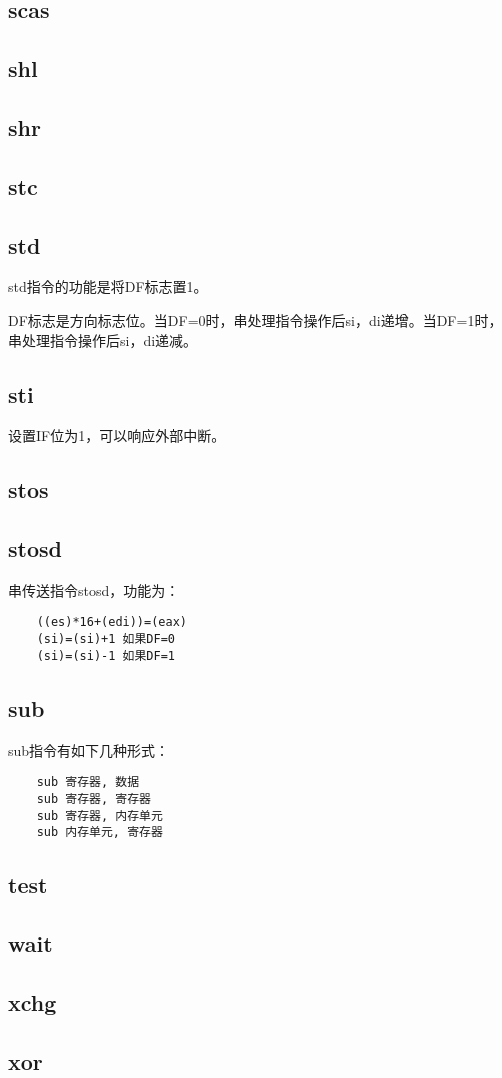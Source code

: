 \documentclass[a4paper,left=2.5cm,right=2.5cm,11pt]{article}
\begin{document}
\subsection{scas}
\subsection{shl}
\subsection{shr}
\subsection{stc}
\subsection{std}
	std指令的功能是将DF标志置1。\par
	DF标志是方向标志位。当DF=0时，串处理指令操作后si，di递增。当DF=1时，串处理指令操作后si，di递减。

\subsection{sti}
	设置IF位为1，可以响应外部中断。

\subsection{stos}
\subsection{stosd}
	串传送指令stosd，功能为：
	\begin{lstlisting}
	((es)*16+(edi))=(eax)
	(si)=(si)+1 如果DF=0
	(si)=(si)-1 如果DF=1
	\end{lstlisting}

\subsection{sub}
	sub指令有如下几种形式：
	\begin{lstlisting}
	sub 寄存器, 数据
	sub 寄存器, 寄存器
	sub 寄存器, 内存单元
	sub 内存单元, 寄存器
	\end{lstlisting}
	
\subsection{test}
\subsection{wait}
\subsection{xchg}
\subsection{xor}
\end{document}
